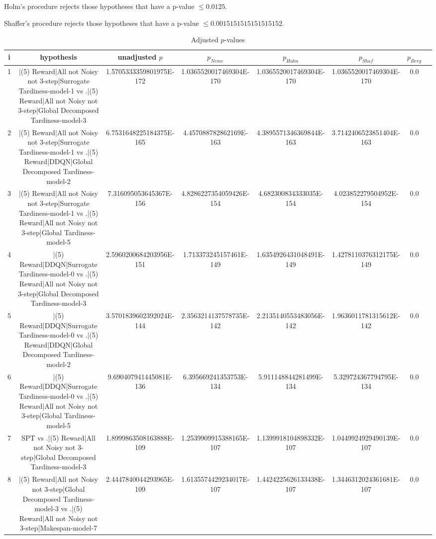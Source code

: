 \documentclass[a3paper,10pt]{article}
\begin{document}
Holm's procedure rejects those hypotheses that have a p-value $\le0.0125$.


Shaffer's procedure rejects those hypotheses that have a p-value $\le0.0015151515151515152$.


\begin{table}[!htp]
\centering\tiny
\caption{Adjusted $p$-values}
\begin{tabular}{cccccccc}
i&hypothesis&unadjusted $p$&$p_{Neme}$&$p_{Holm}$&$p_{Shaf}$&$p_{Berg}$\\
\hline
1&|(5) Reward|All not Noisy not 3-step|Surrogate Tardiness-model-1 vs .|(5) Reward|All not Noisy not 3-step|Global Decomposed Tardiness-model-3&1.5705333359801975E-172&1.0365520017469304E-170&1.0365520017469304E-170&1.0365520017469304E-170&0.0\\
2&|(5) Reward|All not Noisy not 3-step|Surrogate Tardiness-model-1 vs .|(5) Reward|DDQN|Global Decomposed Tardiness-model-2&6.7531648225184375E-165&4.457088782862169E-163&4.3895571346369844E-163&3.7142406523851404E-163&0.0\\
3&|(5) Reward|All not Noisy not 3-step|Surrogate Tardiness-model-1 vs .|(5) Reward|All not Noisy not 3-step|Global Tardiness-model-5&7.316095053645367E-156&4.8286227354059426E-154&4.682300834333035E-154&4.023852279504952E-154&0.0\\
4&|(5) Reward|DDQN|Surrogate Tardiness-model-0 vs .|(5) Reward|All not Noisy not 3-step|Global Decomposed Tardiness-model-3&2.5960200684203956E-151&1.713373245157461E-149&1.6354926431048491E-149&1.4278110376312175E-149&0.0\\
5&|(5) Reward|DDQN|Surrogate Tardiness-model-0 vs .|(5) Reward|DDQN|Global Decomposed Tardiness-model-2&3.5701839602392024E-144&2.3563214137578735E-142&2.2135140553483056E-142&1.9636011781315612E-142&0.0\\
6&|(5) Reward|DDQN|Surrogate Tardiness-model-0 vs .|(5) Reward|All not Noisy not 3-step|Global Tardiness-model-5&9.690407941445081E-136&6.395669241353753E-134&5.911148844281499E-134&5.329724367794795E-134&0.0\\
7&SPT vs .|(5) Reward|All not Noisy not 3-step|Global Decomposed Tardiness-model-3&1.8999863508163888E-109&1.2539909915388165E-107&1.1399918104898332E-107&1.0449924929490139E-107&0.0\\
8&|(5) Reward|All not Noisy not 3-step|Global Decomposed Tardiness-model-3 vs .|(5) Reward|All not Noisy not 3-step|Makespan-model-7&2.4447840044293965E-109&1.6135574429234017E-107&1.4424225626133438E-107&1.3446312024361681E-107&0.0\\

\end{tabular}
\end{table}
\end{document}
